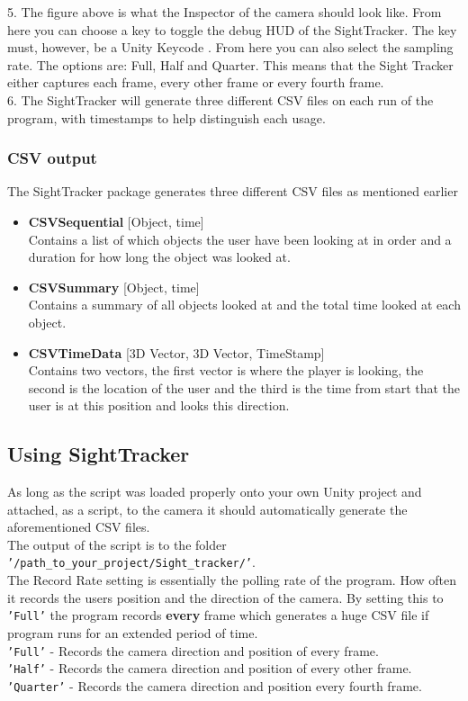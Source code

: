 \documentclass[letterpaper]{article}
\begin{document}
\begin{itemize}
5. The figure above is what the Inspector of the camera should look like. From here you can choose a key to toggle the debug HUD of the SightTracker. The key must, however, be a Unity Keycode \cite{unitykeycode}. From here you can also select the sampling rate. The options are: Full, Half and Quarter. This means that the Sight Tracker either captures each frame, every other frame or every fourth frame.\\[0.15in]
6. The SightTracker will generate three different CSV files on each run of the program, with timestamps to help distinguish each usage.
\end{itemize}
\subsubsection{CSV output}
The SightTracker package generates three different CSV files as mentioned earlier\\
\begin{itemize}
\item \textbf{CSVSequential} [Object, time]\\
Contains a list of which objects the user have been looking at in order and a duration for how long the object was looked at.
\item \textbf{CSVSummary} [Object, time]\\
Contains a summary of all objects looked at and the total time looked at each object.
\item \textbf{CSVTimeData} [3D Vector, 3D Vector, TimeStamp]\\
Contains two vectors, the first vector is where the player is looking, the second is the location of the user and the third is the time from start that the user is at this position and looks this direction.
\end{itemize}
\pagebreak
\subsection{Using SightTracker}
As long as the script was loaded properly onto your own Unity project and attached, as a script, to the camera it should automatically generate the aforementioned CSV files.\\
The output of the script is to the folder \texttt{'/path\_to\_your\_project/Sight\_tracker/'}.\\
The Record Rate setting is essentially the polling rate of the program. How often it records the users position and the direction of the camera. By setting this to \texttt{'Full'} the program records \textbf{every} frame which generates a huge CSV file if program runs for an extended period of time.\\[0.15in]
\texttt{'Full'} - Records the camera direction and position of every frame.\\
\texttt{'Half'} - Records the camera direction and position of every other frame.\\
\texttt{'Quarter'} - Records the camera direction and position every fourth frame.
\end{document}

